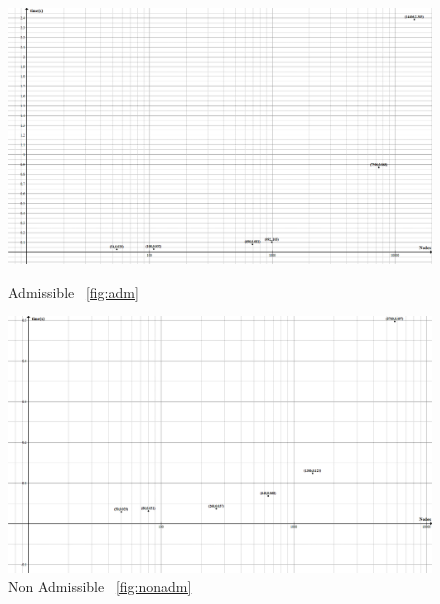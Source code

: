 \documentclass[a4paper,9pt]{article}
\begin{document}
\begin{figure}[H]
	\centering
\begin{minipage}{0.4\textwidth}
	\centering
	\includegraphics[width=0.3\textheight]{files/Adm.png}
	\caption{Admissible ~\ref{fig:adm}}
	\end{minipage}
\begin{minipage}{0.4\textwidth}
	\centering
	\includegraphics[width=0.3\textheight]{files/NonAdm.png}
	\caption{Non Admissible ~\ref{fig:nonadm}}
	\end{minipage}
\end{figure}
\end{document}
